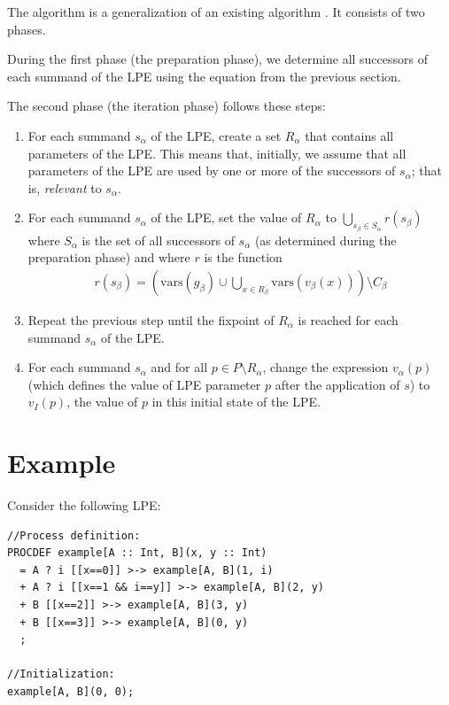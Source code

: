 The algorithm is a generalization of an existing algorithm \cite{van2009state}.
It consists of two phases.

During the first phase (the preparation phase), we determine all successors of each summand of the LPE using the equation from the previous section.

The second phase (the iteration phase) follows these steps:

\begin{enumerate}

\item For each summand $s_\alpha$ of the LPE, create a set $R_\alpha$ that contains all parameters of the LPE.
This means that, initially, we assume that all parameters of the LPE are used by one or more of the successors of $s_\alpha$; that is, \emph{relevant} to $s_\alpha$.

\item For each summand $s_\alpha$ of the LPE, set the value of $R_\alpha$ to $\bigcup\limits_{s_\beta \in S_\alpha}^{} r(s_\beta)$ where $S_\alpha$ is the set of all successors of $s_\alpha$ (as determined during the preparation phase) and where $r$ is the function
\begin{align*}
r(s_\beta) = \left( \text{vars}(g_\beta) \cup \bigcup\limits_{x \in R_\beta}^{} \text{vars}(v_\beta(x)) \right) \setminus C_\beta
\end{align*}

\item Repeat the previous step until the fixpoint of $R_\alpha$ is reached for each summand $s_\alpha$ of the LPE.

\item For each summand $s_\alpha$ and for all $p \in P \setminus R_\alpha$, change the expression $v_\alpha(p)$ (which defines the value of LPE parameter $p$ after the application of $s$) to $v_I(p)$, the value of $p$ in this initial state of the LPE.

\end{enumerate}

\section{Example}

Consider the following LPE:

\begin{lstlisting}
//Process definition:
PROCDEF example[A :: Int, B](x, y :: Int)
  = A ? i [[x==0]] >-> example[A, B](1, i)
  + A ? i [[x==1 && i==y]] >-> example[A, B](2, y)
  + B [[x==2]] >-> example[A, B](3, y)
  + B [[x==3]] >-> example[A, B](0, y)
  ;

//Initialization:
example[A, B](0, 0);
\end{lstlisting}

